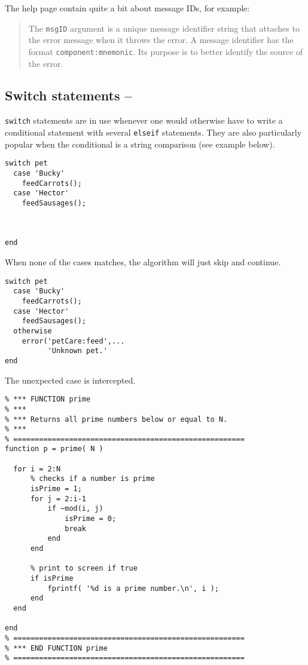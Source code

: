 The \matlab{} help page contain quite a bit about message IDs, for example:
\begin{quotation}
The \lstinline!msgID! argument is a unique message identifier string that \matlab{} attaches to the error message when it throws the error. A message identifier has the format \lstinline!component:mnemonic!. Its purpose is to better identify the source of the error.
\end{quotation}


\subsection{Switch statements -- \cleansymbol\cleansymbol}

\lstinline!switch! statements are in use whenever one would otherwise have to write a conditional statement with several \lstinline!elseif! statements. They are also particularly popular when the conditional is a string comparison (see example below).

\hfill
\begin{minipage}[t]{.45\textwidth}
\begin{lstlisting}[framerule=2pt,rulecolor=\color{badred}]
switch pet
  case 'Bucky'
    feedCarrots();
  case 'Hector'
    feedSausages();



end
\end{lstlisting}
When none of the cases matches, the algorithm will just skip and continue.
\end{minipage}
\hfill
\begin{minipage}[t]{.45\textwidth}
\begin{lstlisting}[framerule=2pt,rulecolor=\color{goodgreen}]
switch pet
  case 'Bucky'
    feedCarrots();
  case 'Hector'
    feedSausages();
  otherwise
    error('petCare:feed',...
          'Unknown pet.'
end
\end{lstlisting}
The unexpected case is intercepted.
\end{minipage}
\hfill



\begin{lstlisting}[framerule=2pt,rulecolor=\color{goodgreen},float,caption={The same code as in listing \ref{listing:prime1}, with rules of style applied. It should now be somewhat easier to maintain and improve the code. Do you have ideas how to speed it up?}]
% ======================================================
% *** FUNCTION prime
% ***
% *** Returns all prime numbers below or equal to N.
% ***
% ======================================================
function p = prime( N )

  for i = 2:N
      % checks if a number is prime
      isPrime = 1;
      for j = 2:i-1
          if ~mod(i, j)
              isPrime = 0;
              break
          end
      end

      % print to screen if true
      if isPrime
          fprintf( '%d is a prime number.\n', i );
      end
  end

end
% ======================================================
% *** END FUNCTION prime
% ======================================================
\end{lstlisting}
